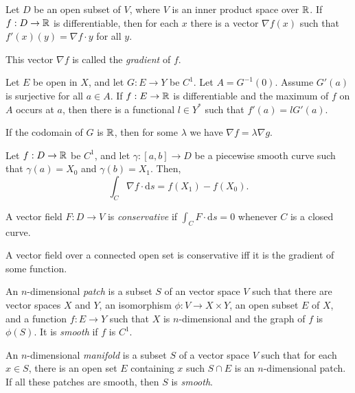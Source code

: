 \begin{prop}
    Let $D$ be an open subset of $V$, where $V$ is an inner product space over $\mathbb{R}$.
    If $f:D\to\mathbb{R}$ is differentiable, then for each $x$ there is a vector $\nabla f(x)$ such
    that $f'(x)(y)=\nabla f\cdot y$ for all $y$.
\end{prop}
\begin{defn}
    This vector $\nabla f$ is called the \emph{gradient} of $f$.
\end{defn}
\begin{prop}
    Let $E$ be open in $X$, and let $G:E\to Y$ be $C^1$. Let $A=G^{-1}(0)$.
    Assume $G'(a)$ is surjective for all $a\in A$.
    If $f:E\to\mathbb{R}$ is differentiable and the maximum of $f$ on $A$ occurs at $a$,
    then there is a functional $l\in Y^*$ such that $f'(a)=lG'(a)$.
\end{prop}
\begin{cor}
    If the codomain of $G$ is $\mathbb{R}$,
    then for some $\lambda$ we have $\nabla f=\lambda\nabla g$.
\end{cor}
\begin{thm}
    Let $f:D\to\mathbb{R}$ be $C^1$, and let $\gamma:[a,b]\to D$ be a piecewise smooth
    curve such that $\gamma(a)=X_0$ and $\gamma(b)=X_1$. Then,
    \[\int_C\nabla f\cdot\mathrm ds=f(X_1)-f(X_0).\]
\end{thm}
\begin{defn}
    A vector field $F:D\to V$ is \emph{conservative} if $\int_C F\cdot\mathrm ds=0$
    whenever $C$ is a closed curve.
\end{defn}
\begin{cor}
    A vector field over a connected open set is conservative iff it is the
    gradient of some function.
\end{cor}
\begin{defn}
    An $n$-dimensional \emph{patch} is a subset $S$ of an vector space $V$ such
    that there are vector spaces $X$ and $Y$, an isomorphism $\phi:V\to
    X\times Y$, an open subset $E$ of $X$,
    and a function $f:E\to Y$ such that $X$ is $n$-dimensional and
    the graph of $f$ is $\phi(S)$. It is \emph{smooth} if $f$ is $C^1$.

    An $n$-dimensional \emph{manifold} is a subset $S$ of a vector space $V$ such
    that for each $x\in S$, there is an open set $E$ containing $x$ such $S\cap
    E$ is an $n$-dimensional patch. If all these patches are smooth, then $S$ is
    \emph{smooth}.
\end{defn}
